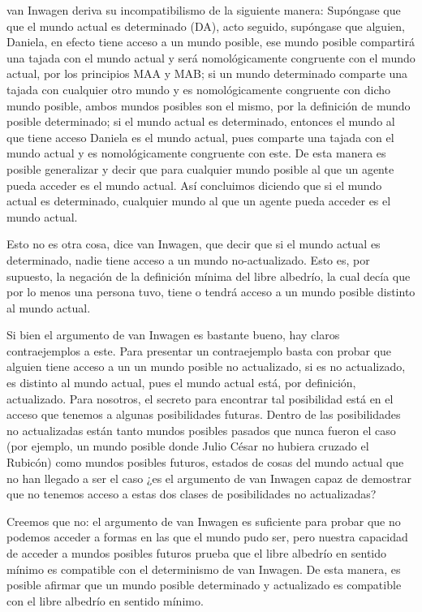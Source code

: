 \documentclass[12pt]{article} %
\begin{document}
van Inwagen deriva su incompatibilismo de la siguiente manera:
Supóngase que que el mundo actual es determinado (DA), acto seguido, supóngase que alguien, Daniela, en efecto tiene acceso a un mundo posible, ese mundo posible compartirá una tajada con el mundo actual y será nomológicamente congruente con el mundo actual, por los principios MAA y MAB; si un mundo determinado comparte una tajada con cualquier otro mundo y es nomológicamente congruente con dicho mundo posible, ambos mundos posibles son el mismo, por la definición de mundo posible determinado; si el mundo actual es determinado, entonces el mundo al que tiene acceso Daniela es el mundo actual, pues comparte una tajada con el mundo actual y es nomológicamente congruente con este. De esta manera es posible generalizar y decir que para cualquier mundo posible al que un agente pueda acceder es el mundo actual. Así concluimos diciendo que si el mundo actual es determinado, cualquier mundo al que un agente pueda acceder es el mundo actual.

Esto no es otra cosa, dice van Inwagen, que decir que si el mundo actual es determinado, nadie tiene acceso a un mundo no-actualizado. Esto es, por supuesto, la negación de la definición mínima del libre albedrío, la cual decía que por lo menos una persona tuvo, tiene o tendrá acceso a un mundo posible distinto al mundo actual.

Si bien el argumento de van Inwagen es bastante bueno, hay claros contraejemplos a este. Para presentar un contraejemplo basta con probar que alguien tiene acceso a un un mundo posible no actualizado, si es no actualizado, es distinto al mundo actual, pues el mundo actual está, por definición, actualizado. Para nosotros, el secreto para encontrar tal posibilidad está en el acceso que tenemos a algunas posibilidades futuras. Dentro de las posibilidades no actualizadas están tanto mundos posibles pasados que nunca fueron el caso (por ejemplo, un mundo posible donde Julio César no hubiera cruzado el Rubicón) como mundos posibles futuros, estados de cosas del mundo actual que no han llegado a ser el caso ¿es el argumento de van Inwagen capaz de demostrar que no tenemos acceso a estas dos clases de posibilidades no actualizadas? 

Creemos que no: el argumento de van Inwagen es suficiente para probar que no podemos acceder a formas en las que el mundo pudo ser, pero nuestra capacidad de acceder a mundos posibles futuros prueba que el libre albedrío en sentido mínimo es compatible con el determinismo de van Inwagen. De esta manera, es posible afirmar que un mundo posible determinado y actualizado es compatible con el libre albedrío en sentido mínimo.
\end{document}
